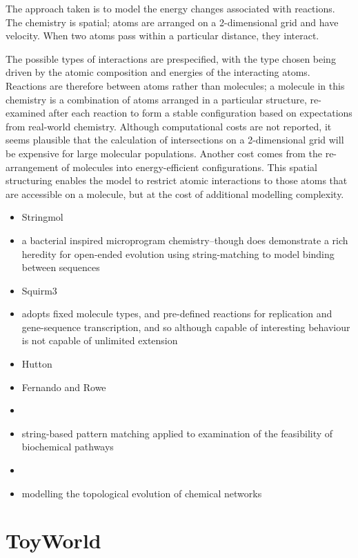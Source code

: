 The approach taken is to model the energy changes associated with
reactions. The chemistry is spatial; atoms are arranged on a
2-dimensional grid and have velocity. When two atoms pass within a
particular distance, they interact.

The possible types of interactions are prespecified, with the type
chosen being driven by the atomic composition and energies of the
interacting atoms. Reactions are therefore between atoms rather than
molecules; a molecule in this chemistry is a combination of atoms
arranged in a particular structure, re-examined after each reaction to
form a stable configuration based on expectations from real-world
chemistry. Although computational costs are not reported, it seems
plausible that the calculation of intersections on a 2-dimensional grid
will be expensive for large molecular populations. Another cost comes
from the re-arrangement of molecules into energy-efficient
configurations. This spatial structuring enables the model to restrict
atomic interactions to those atoms that are accessible on a molecule,
but at the cost of additional modelling complexity.

\begin{itemize}
	\item
 Stringmol
	\item
 a bacterial inspired microprogram chemistry--though does demonstrate
 a rich heredity for open-ended evolution using string-matching to
 model binding between sequences
	\item
 Squirm3
	\item
 adopts fixed molecule types, and pre-defined reactions for replication
 and gene-sequence transcription, and so although capable of
 interesting behaviour is not capable of unlimited extension
	\item
 Hutton
	\item
 Fernando and Rowe
	\item
 \autocite{Tominaga2009,Tominaga2007,Tominaga2004}
	\item
 string-based pattern matching applied to examination of the
 feasibility of biochemical pathways
	\item
 \autocite{Lenaerts2009}
	\item
 modelling the topological evolution of chemical networks
\end{itemize}

\chapter{ToyWorld}\label{toyworld}

